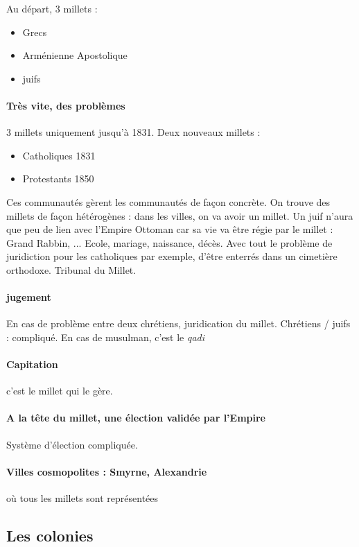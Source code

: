 Au départ, 3 millets : 
\begin{itemize}
    \item Grecs
    \item Arménienne Apostolique
    \item juifs
\end{itemize}
\paragraph{Très vite, des problèmes} 3 millets uniquement jusqu'à 1831. Deux nouveaux millets : 
\begin{itemize}
    \item Catholiques 1831
    \item Protestants 1850
\end{itemize}
Ces communautés gèrent les communautés de façon concrète. 
On trouve des millets de façon hétérogènes : dans les villes, on va avoir un millet. 
Un juif n'aura que peu de lien avec l'Empire Ottoman car sa vie va être régie par le millet : Grand Rabbin, ... Ecole, mariage, naissance, décès. 
Avec tout le problème de juridiction pour les catholiques par exemple, d'être enterrés dans un cimetière orthodoxe.
Tribunal du Millet. 

\paragraph{jugement} En cas de problème entre deux chrétiens, juridication du millet. Chrétiens / juifs : compliqué. En cas de musulman, c'est le \textit{qadi}

\paragraph{Capitation} c'est le millet qui le gère. 

\paragraph{A la tête du millet, une élection validée par l'Empire} Système d'élection compliquée. 


\paragraph{Villes cosmopolites : Smyrne, Alexandrie} où tous les millets sont représentées

\subsection{Les colonies}


